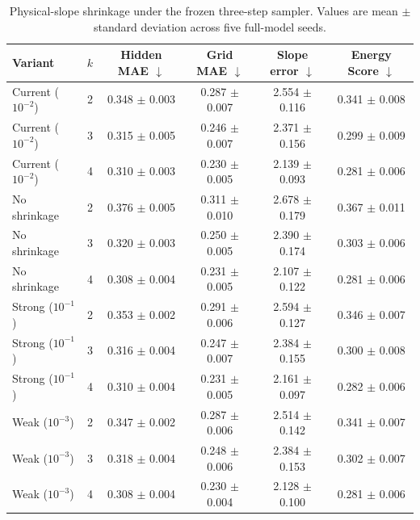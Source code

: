 \begin{table}[t]
\caption{Physical-slope shrinkage under the frozen three-step sampler. Values are mean $\pm$ standard deviation across five full-model seeds.}
\label{tab:shrinkage}
\centering\scriptsize\setlength{\tabcolsep}{5pt}
\begin{tabular}{lccccc}
\toprule
Variant & $k$ & Hidden MAE $\downarrow$ & Grid MAE $\downarrow$ & Slope error $\downarrow$ & Energy Score $\downarrow$ \\
\midrule
Current ($10^{-2}$) & 2 & 0.348 $\pm$ 0.003 & 0.287 $\pm$ 0.007 & 2.554 $\pm$ 0.116 & 0.341 $\pm$ 0.008 \\
Current ($10^{-2}$) & 3 & 0.315 $\pm$ 0.005 & 0.246 $\pm$ 0.007 & 2.371 $\pm$ 0.156 & 0.299 $\pm$ 0.009 \\
Current ($10^{-2}$) & 4 & 0.310 $\pm$ 0.003 & 0.230 $\pm$ 0.005 & 2.139 $\pm$ 0.093 & 0.281 $\pm$ 0.006 \\
No shrinkage & 2 & 0.376 $\pm$ 0.005 & 0.311 $\pm$ 0.010 & 2.678 $\pm$ 0.179 & 0.367 $\pm$ 0.011 \\
No shrinkage & 3 & 0.320 $\pm$ 0.003 & 0.250 $\pm$ 0.005 & 2.390 $\pm$ 0.174 & 0.303 $\pm$ 0.006 \\
No shrinkage & 4 & 0.308 $\pm$ 0.004 & 0.231 $\pm$ 0.005 & 2.107 $\pm$ 0.122 & 0.281 $\pm$ 0.006 \\
Strong ($10^{-1}$) & 2 & 0.353 $\pm$ 0.002 & 0.291 $\pm$ 0.006 & 2.594 $\pm$ 0.127 & 0.346 $\pm$ 0.007 \\
Strong ($10^{-1}$) & 3 & 0.316 $\pm$ 0.004 & 0.247 $\pm$ 0.007 & 2.384 $\pm$ 0.155 & 0.300 $\pm$ 0.008 \\
Strong ($10^{-1}$) & 4 & 0.310 $\pm$ 0.004 & 0.231 $\pm$ 0.005 & 2.161 $\pm$ 0.097 & 0.282 $\pm$ 0.006 \\
Weak ($10^{-3}$) & 2 & 0.347 $\pm$ 0.002 & 0.287 $\pm$ 0.006 & 2.514 $\pm$ 0.142 & 0.341 $\pm$ 0.007 \\
Weak ($10^{-3}$) & 3 & 0.318 $\pm$ 0.004 & 0.248 $\pm$ 0.006 & 2.384 $\pm$ 0.153 & 0.302 $\pm$ 0.007 \\
Weak ($10^{-3}$) & 4 & 0.308 $\pm$ 0.004 & 0.230 $\pm$ 0.004 & 2.128 $\pm$ 0.100 & 0.281 $\pm$ 0.006 \\
\bottomrule
\end{tabular}
\end{table}
